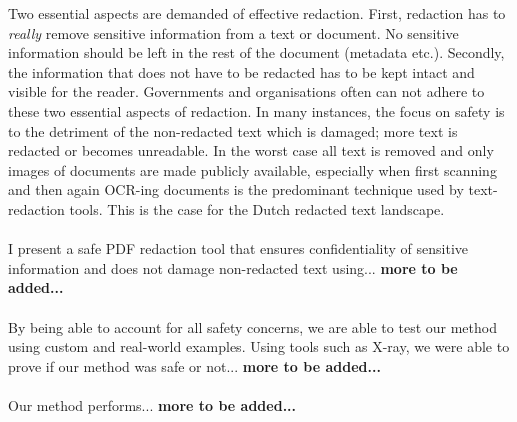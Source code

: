 Two essential aspects are demanded of effective redaction. First, redaction has to \textit{really} remove sensitive information from a text or document. No sensitive information should be left in the rest of the document (metadata etc.). Secondly, the information that does not have to be redacted has to be kept intact and visible for the reader. Governments and organisations often can not adhere to these two essential aspects of redaction. In many instances, the focus on safety is to the detriment of the non-redacted text which is damaged; more text is redacted or becomes unreadable. In the worst case all text is removed and only images of documents are made publicly available, especially when first scanning and then again OCR-ing documents is the predominant technique used by text-redaction tools. This is the case for the Dutch redacted text landscape.
\\\\
I present a safe PDF redaction tool that ensures confidentiality of sensitive information and does not damage non-redacted text using... \textbf{more to be added...}
\\\\
By being able to account for all safety concerns, we are able to test our method using custom and real-world examples. Using tools such as X-ray, we were able to prove if our method was safe or not... \textbf{more to be added...}
\\\\
Our method performs... \textbf{more to be added...}



